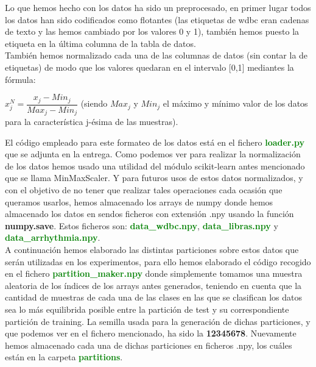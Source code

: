 \documentclass[10pt,a4paper]{article}
\begin{document}
Lo que hemos hecho con los datos ha sido un preprocesado, en primer lugar todos los datos han sido codificados como flotantes (las etiquetas de wdbc eran cadenas de texto y las hemos cambiado por los valores 0 y 1), también hemos puesto la etiqueta en la última columna de la tabla de datos.\\

También hemos normalizado cada una de las columnas de datos (sin contar la de etiquetas) de modo que los valores quedaran en el intervalo [0,1] mediantes la fórmula:\\

\begin{center}
$x_j^N = \dfrac{x_j - Min_j}{Max_j-Min_j}$ (siendo $Max_j$ y $Min_j$ el máximo y mínimo valor de los datos para la característica j-ésima de las muestras).
\end{center}

El código empleado para este formateo de los datos está en el fichero \textbf{\textcolor{green}{loader.py}} que se adjunta en la entrega. Como podemos ver para realizar la normalización de los datos hemos usado una utilidad del módulo scikit-learn antes mencionado que se llama MinMaxScaler. Y para futuros usos de estos datos normalizados, y con el objetivo de no tener que realizar tales operaciones cada ocasión que queramos usarlos, hemos almacenado los arrays de numpy donde hemos almacenado los datos en sendos ficheros con extensión .npy usando la función \textbf{numpy.save}. Estos ficheros son: \textbf{\textcolor{green}{data\_wdbc.npy}}, \textbf{\textcolor{green}{data\_libras.npy}} y \textbf{\textcolor{green}{data\_arrhythmia.npy}}.\\

A continuación hemos elaborado las distintas particiones sobre estos datos que serán utilizadas en los experimentos, para ello hemos elaborado el código recogido en el fichero \textbf{\textcolor{green}{partition\_maker.npy}} donde simplemente tomamos una muestra aleatoria de los índices de los arrays antes generados, teniendo en cuenta que la cantidad de muestras de cada una de las clases en las que se clasifican los datos sea lo más equilibrida posible entre la partición de test y su correspondiente partición de training. La semilla usada para la generación de dichas particiones, y que podemos ver en el fichero mencionado, ha sido la \textbf{12345678}. Nuevamente hemos almacenado cada una de dichas particiones en ficheros .npy, los cuáles están en la carpeta \textbf{\textcolor{green}{partitions}}.\\
\end{document}
